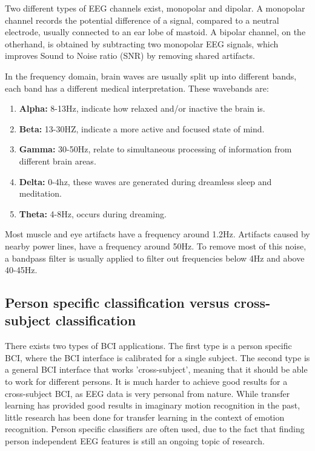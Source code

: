 
Two different types of EEG channels exist, monopolar and dipolar. A monopolar channel records the potential difference of a signal, compared to a neutral electrode, usually connected to an ear lobe of mastoid. A bipolar channel, on the otherhand, is obtained by subtracting two monopolar EEG signals, which improves Sound to Noise ratio (SNR)  by removing shared artifacts\cite{MonoBiPolar}. 

\npar 

In the frequency domain, brain waves are usually split up into different bands\cite{EmotionRelativePower,WavesSite}, each band has a different medical interpretation. These wavebands \label{wavebands} are:
\begin{enumerate}
\item \textbf{Alpha:} 8-13Hz, indicate how relaxed and/or inactive the brain is.
\item \textbf{Beta:} 13-30HZ, indicate a more active and focused state of mind.
\item \textbf{Gamma:} 30-50Hz, relate to simultaneous processing of information from different brain areas.
\item \textbf{Delta:} 0-4hz, these waves are generated during dreamless sleep and meditation.
\item \textbf{Theta:} 4-8Hz, occurs during dreaming.
\end{enumerate}

Most muscle and eye artifacts have a frequency around 1.2Hz. Artifacts caused by nearby power lines, have a frequency around 50Hz\cite{ExtendedPaper}. To remove most of this noise, a bandpass filter is usually applied to filter out frequencies below 4Hz and above 40-45Hz.

\subsection{Person specific classification versus cross-subject classification}
There exists two types of BCI applications. The first type is a person specific BCI, where the BCI interface is calibrated for a single subject. The second type is a general BCI interface that works 'cross-subject', meaning that it should be able to work for different persons. It is much harder to achieve good results for a cross-subject BCI, as EEG data is very personal from nature\citep{DEAP}. While transfer learning has provided good results in imaginary motion recognition in the past, little research has been done for transfer learning in the context of emotion recognition. Person specific classifiers are often used, due to the fact that finding person independent EEG features is still an ongoing topic of research\citep{DEAP}.

